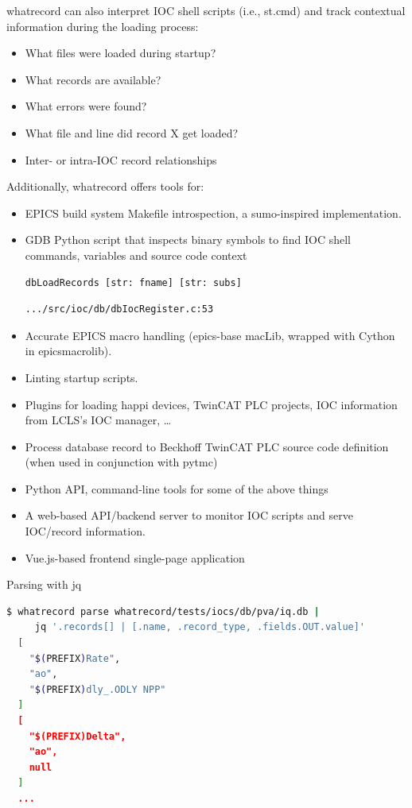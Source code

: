 \documentclass[letter,
               keeplastbox,   %
               ]{jacow}
\begin{document}
whatrecord can also interpret IOC shell scripts (i.e., st.cmd) and track
contextual information during the loading process:
\begin{itemize}
  \item What files were loaded during startup?
  \item What records are available?
  \item What errors were found?
  \item What file and line did record X get loaded?
  \item Inter- or intra-IOC record relationships
\end{itemize}

Additionally, whatrecord offers tools for:
\begin{itemize}
  \item EPICS build system Makefile introspection, a sumo\cite{sumo}-inspired
    implementation.
  \item GDB Python script that inspects binary symbols to find IOC shell commands, variables and source code context
    \begin{verbatim}dbLoadRecords [str: fname] [str: subs]\end{verbatim}
    \begin{verbatim}.../src/ioc/db/dbIocRegister.c:53\end{verbatim}
  \item Accurate EPICS macro handling (epics-base macLib, wrapped with Cython in epicsmacrolib\cite{epicsmacrolib}).
  \item Linting startup scripts.
  \item Plugins for loading happi devices, TwinCAT PLC projects, IOC information from LCLS’s IOC manager, …
  \item Process database record to Beckhoff TwinCAT PLC source code definition (when used in conjunction with pytmc\cite{pytmc})
  \item Python API, command-line tools for some of the above things
  \item A web-based API/backend server to monitor IOC scripts and serve IOC/record information.
  \item Vue.js-based frontend single-page application
\end{itemize}


Parsing with jq

\begin{lstlisting}[language=bash]
  $ whatrecord parse whatrecord/tests/iocs/db/pva/iq.db |
     jq '.records[] | [.name, .record_type, .fields.OUT.value]'
  [
    "$(PREFIX)Rate",
    "ao",
    "$(PREFIX)dly_.ODLY NPP"
  ]
  [
    "$(PREFIX)Delta",
    "ao",
    null
  ]
  ...
\end{lstlisting}
\end{document}
